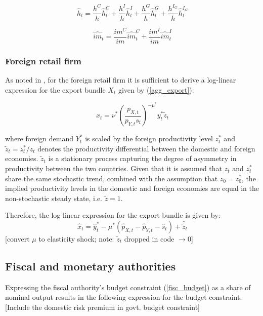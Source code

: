 \documentclass[a4paper,11pt]{article}
\numberwithin{equation}{section}
\begin{document}
	\begin{equation}
	\hat{h}_t=\frac{h^C}{h}\hat{h}_t^C+\frac{h^I}{h}\hat{h}_t^I+\frac{h^G}{h}\hat{h}_t^G+\frac{h^{I_G}}{h}\hat{h}_t^{I_G}
	\end{equation}
	
	\begin{equation}
	\widehat{im}_t=\frac{im^C}{im}\widehat{im}_t^C+\frac{im^I}{im}\widehat{im}_t^I
	\end{equation} 
	
	\subsubsection{Foreign retail firm}
	
	As noted in \cite{christoffel2008}, for the foreign retail firm it is sufficient to derive a log-linear expression for the export bundle $X_t$ given by (\ref{agg_export}):
	
	\begin{equation}
	x_t=\nu^*\left(\frac{p_{X,t}}{p_{Y,t}s_t}\right)^{-\mu^*}y_t^*\tilde{z}_t
	\end{equation}
	
	
	where foreign demand $Y_t^*$ is scaled by the foreign productivity level $z_t^*$ and $\tilde{z}_t=z_t^*/z_t$ denotes the productivity differential between the domestic and foreign economies. $\tilde{z}_t$ is a stationary process capturing the degree of asymmetry in productivity between the two countries. Given that it is assumed that $z_t$ and $z_t^*$ share the same stochastic trend, combined with the assumption that $z_0=z_0^*$, the implied productivity levels in the domestic and foreign economies are equal in the non-stochastic steady state, i.e. $\tilde{z}=1$.
	
	Therefore, the log-linear expression for the export bundle is given by:
	{\color{red}
	\begin{equation}
	\hat{x}_t=\hat{y}_t^*-\mu^*\left(\hat{p}_{X,t}-\hat{p}_{Y,t}-\hat{s}_t\right)+\hat{\tilde{z}}_t
	\end{equation} 
	[convert $\mu$ to elasticity shock; note: $\tilde{z}_t$ dropped in code $\to 0$]}
	\subsection{Fiscal and monetary authorities}
	
	Expressing the fiscal authority's budget constraint (\ref{fisc_budget}) as a share of nominal output results in the following expression for the budget constraint: {\color{red}[Include the domestic risk premium in govt. budget constraint]}
	
\end{document}
